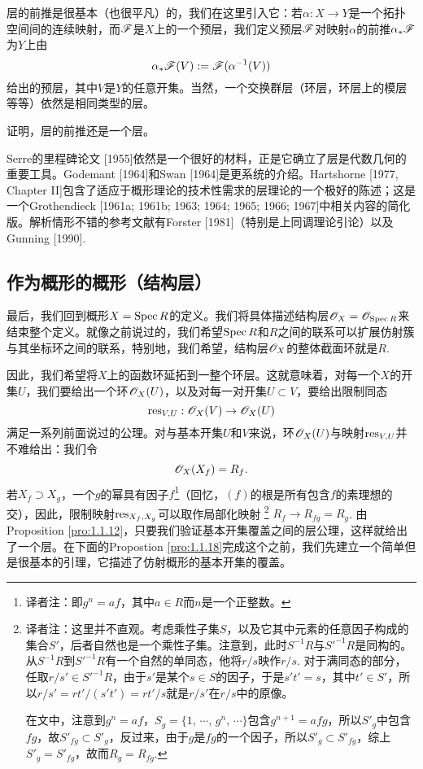 层的前推是很基本（也很平凡）的，我们在这里引入它：若$\alpha:X\to Y$是一个拓扑空间间的连续映射，而$\mathscr{F}$是$X$上的一个预层，我们定义预层$\mathscr{F}$对映射$\alpha$的前推$\alpha_*\mathscr{F}$为$Y$上由
\[
	\alpha_*\mathscr{F}(V):=\mathscr{F}(\alpha^{-1}(V))
\]
给出的预层，其中$V$是$Y$的任意开集。当然，一个交换群层（环层，环层上的模层等等）依然是相同类型的层。

\begin{exe}
证明，层的前推还是一个层。
\end{exe}

 \label{ref:1}Serre的里程碑论文 [1955]依然是一个很好的材料，正是它确立了层是代数几何的重要工具。Godemant [1964]和Swan [1964]是更系统的介绍。Hartshorne [1977, Chapter II]包含了适应于概形理论的技术性需求的层理论的一个极好的陈述；这是一个Grothendieck [1961a; 1961b; 1963; 1964; 1965; 1966; 1967]中相关内容的简化版。解析情形不错的参考文献有Forster [1981]（特别是上同调理论引论）以及Gunning [1990].

\subsection{作为概形的概形（结构层）}

最后，我们回到概形$X=\operatorname{Spec} R$的定义。我们将具体描述结构层$\mathscr{O}_X=\mathscr{O}_{\operatorname{Spec} R}$来结束整个定义。就像之前说过的，我们希望$\operatorname{Spec} R$和$R$之间的联系可以扩展仿射簇与其坐标环之间的联系，特别地，我们希望，结构层$\mathscr{O}_X$的整体截面环就是$R$.

因此，我们希望将$X$上的函数环延拓到一整个环层。这就意味着，对每一个$X$的开集$U$，我们要给出一个环$\mathscr{O}_X(U)$，以及对每一对开集$U\subset V$，要给出限制同态
\[
	\operatorname{res}_{V,U}:\mathscr{O}_X(V)\to \mathscr{O}_X(U)
\]
满足一系列前面说过的公理。对与基本开集$U$和$V$来说，环$\mathscr{O}_X(U)$与映射$\operatorname{res}_{V,U}$并不难给出：我们令
\[
	\mathscr{O}_X(X_f)=R_f.
\]
若$X_f\supset X_g$，一个$g$的幂具有因子$f$\footnote{译者注：即$g^n=af$，其中$a\in R$而$n$是一个正整数。}（回忆，$(f)$的根是所有包含$f$的素理想的交），因此，限制映射$\operatorname{res}_{X_f,X_g}$可以取作局部化映射
\footnote{译者注：这里并不直观。考虑乘性子集$S$，以及它其中元素的任意因子构成的集合$S'$，后者自然也是一个乘性子集。注意到，此时$S^{-1}R$与${S'}^{-1}R$是同构的。从$S^{-1}R$到${S'}^{-1}R$有一个自然的单同态，他将$r/s$映作$r/s$. 对于满同态的部分，任取$r/s'\in {S'}^{-1}R$，由于$s'$是某个$s\in S$的因子，于是$s't'=s$，其中$t'\in S'$，所以$r/s'=rt'/(s't')=rt'/s$就是$r/s'$在$r/s$中的原像。

在文中，注意到$g^n=af$，$S_g=\{1$, $\cdots$, $g^n$, $\cdots\}$包含$g^{n+1}=afg$，所以$S'_g$中包含$fg$，故$S'_{fg}\subset S'_g$，反过来，由于$g$是$fg$的一个因子，所以$S'_g\subset S'_{fg}$，综上$S'_g=S'_{fg}$，故而$R_g=R_{fg}$.}
$R_f\to R_{fg}=R_g$. 由Proposition \ref{pro:1.1.12}，只要我们验证基本开集覆盖之间的层公理，这样就给出了一个层。在下面的Propostion \ref{pro:1.1.18}完成这个之前，我们先建立一个简单但是很基本的引理，它描述了仿射概形的基本开集的覆盖。

